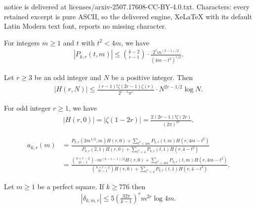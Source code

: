 \documentclass[10pt,a4paper]{amsart}
\begin{document}
notice is delivered at licenses/arxiv-2507.17608-CC-BY-4.0.txt. Characters: every retained excerpt is pure ASCII, so the delivered engine, XeLaTeX with its default Latin Modern text font, reports no missing character.
\begin{lemma}\label{lem:boundP_k,r}
    For integers $m\geq1$ and $t$ with $t^2<4m$, we have
    \begin{align}
        |P_{k,r}(t,m)|\leq\binom{k-2}{r-1}\cdot\frac{2^rm^{(k-1)/2}}{(4m-t^2)^{r/2}}.
    \end{align}
\end{lemma}

\begin{lemma}\label{lem:boundsforclassnumber}
    Let $r\geq3$ be an odd integer and $N$ be a positive integer. Then
    \begin{align}
        |H(r,N)|\leq\frac{(r-1)!\zeta(2r-1)\zeta(r)}{2^{r-1}\pi^r}\cdot N^{2r-1/2}\log N.
    \end{align}
\end{lemma}

\begin{lemma}\label{lem:zetavaluesatoddnegative}
For odd integer $r\geq1$, we have
\begin{align}
    |H(r,0)|=|\zeta(1-2r)|=\frac{2(2r-1)!\zeta(2r)}{(2\pi)^{2r}}.
\end{align}
\end{lemma}

\begin{align}
    a_{k,r}(m)&=\frac
    {P_{k,r}(2m^{1/2},m)H(r,0)+\sum_{t^2<4m}P_{k,r}(t,m)H(r,4m-t^2)}{P_{k,r}(2,1)H(r,0)+\sum_{t^2<4}P_{k,r}(t,1)H(r,4-t^2)}\\&=\frac
    {\binom{k+r-2}{2r-1}\cdot m^{(k-r-1)/2}H(r,0)+\sum_{t^2<4m}P_{k,r}(t,m)H(r,4m-t^2)}{\binom{k+r-2}{2r-1}H(r,0)+\sum_{t^2<4}P_{k,r}(t,1)H(r,4-t^2)}.\label{eq:akrmiddlestep}
\end{align}

\begin{proposition}\label{prop:estimateofFourierco}
Let $m\geq1$ be a perfect square.
If $k\geq776$ then
\begin{align}
|\delta_{k,m,r}|\leq5\left(\frac{32\pi}{k-1}\right)^rm^{2r}\log4m.
\end{align} 
\end{proposition}
\end{document}
